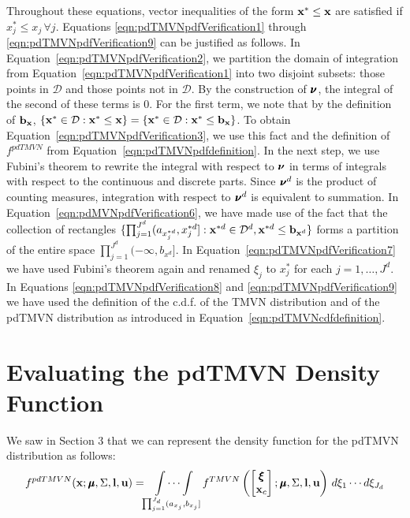 \documentclass[fleqn]{article}
\begin{document}
Throughout these equations, vector inequalities of the form ${\bf x}^* \leq {\bf x}$ are satisfied if $x^*_j \leq x_j \, \forall j$.  Equations \eqref{eqn:pdTMVNpdfVerification1} through \eqref{eqn:pdTMVNpdfVerification9} can be justified as follows.  In Equation~\eqref{eqn:pdTMVNpdfVerification2}, we partition the domain of integration from Equation~\eqref{eqn:pdTMVNpdfVerification1} into two disjoint subsets: those points in $\mathcal{D}$ and those points not in $\mathcal{D}$.  By the construction of $\bnu$, the integral of the second of these terms is $0$.  For the first term, we note that by the definition of ${\bf b}_{\bf x}$, $\{{\bf x}^* \in \mathcal{D} : {\bf x}^* \leq {\bf x} \} = \{{\bf x}^* \in \mathcal{D} : {\bf x}^* \leq {\bf b}_{\bf x} \}$.  To obtain Equation~\eqref{eqn:pdTMVNpdfVerification3}, we use this fact and the definition of $f^{pdTMVN}$ from Equation~\eqref{eqn:pdTMVNpdfdefinition}.  In the next step, we use Fubini's theorem to rewrite the integral with respect to $\bnu$ in terms of integrals with respect to the continuous and discrete parts.  Since $\bnu^d$ is the product of counting measures, integration with respect to $\bnu^d$ is equivalent to summation.  In Equation~\eqref{eqn:pdMVNpdfVerification6}, we have made use of the fact that the collection of rectangles $\{\prod_{j=1}^{J^d}(a_{x^{*d}_j}, x^{*d}_j]: {\bf x}^{*d} \in \mathcal{D}^d, {\bf x}^{*d} \leq {\bf b}_{{\bf x}^d} \}$ forms a partition of the entire space $\prod_{j=1}^{J^d} (-\infty, b_{x^d}]$.  In Equation~\eqref{eqn:pdTMVNpdfVerification7} we have used Fubini's theorem again and renamed $\xi_j$ to $x^*_j$ for each $j = 1, \ldots, J^d$.  In Equations \eqref{eqn:pdTMVNpdfVerification8} and \eqref{eqn:pdTMVNpdfVerification9} we have used the definition of the c.d.f. of the TMVN distribution and of the pdTMVN distribution as introduced in Equation~\eqref{eqn:pdTMVNcdfdefinition}.

\section{Evaluating the pdTMVN Density Function}
\label{sec:evalDensity}

We saw in Section 3 that we can represent the density function for the pdTMVN distribution as follows:
\begin{equation}
f^{pdTMVN}(\bx ; \bmu, \Sigma, \bl, \bu) = \idotsint\limits_{\prod_{j=1}^{J_d} (a_{x_j}, b_{x_j}]} f^{TMVN}\left(\begin{bmatrix} \bxi \\ \bx_c \end{bmatrix}; \bmu, \Sigma, \bl, \bu\right) \, d \xi_1 \cdots d \xi_{J_d} \label{eqn:pdtmvnDensityFn}
\end{equation}
\end{document}
